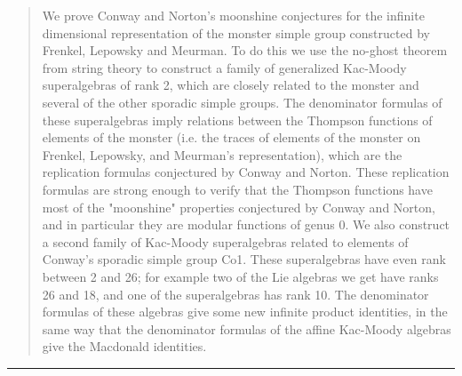 \begin{quote}
    We prove Conway and Norton's moonshine conjectures for the infinite
    dimensional representation of the monster simple group constructed by
    Frenkel, Lepowsky and Meurman. To do this we use the no-ghost theorem from
    string theory to construct a family of generalized Kac-Moody superalgebras
    of rank 2, which are closely related to the monster and several of the
    other sporadic simple groups. The denominator formulas of these
    superalgebras imply relations between the Thompson functions of elements of
    the monster (i.e. the traces of elements of the monster on Frenkel,
    Lepowsky, and Meurman's representation), which are the replication formulas
    conjectured by Conway and Norton. These replication formulas are strong
    enough to verify that the Thompson functions have most of the "moonshine"
    properties conjectured by Conway and Norton, and in particular they are
    modular functions of genus 0. We also construct a second family of
    Kac-Moody superalgebras related to elements of Conway's sporadic simple
    group Co1. These superalgebras have even rank between 2 and 26; for example
    two of the Lie algebras we get have ranks 26 and 18, and one of the
    superalgebras has rank 10. The denominator formulas of these algebras give
    some new infinite product identities, in the same way that the denominator
    formulas of the affine Kac-Moody algebras give the Macdonald identities.
\end{quote}
    


\par\noindent\rule{\textwidth}{0.4pt}


